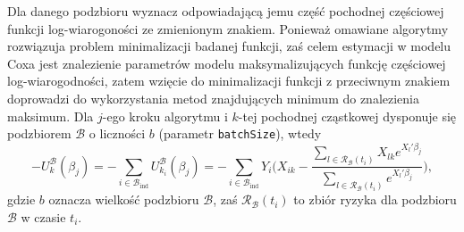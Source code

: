 \begin{Shaded}
\begin{Highlighting}[]
  \StringTok{ }\NormalTok{)\{}
    \StringTok{ }\NormalTok{mf[batchSamplesStarts[i]:(batchSamplesStarts[i]+batchSize}\NormalTok{), ]}
    \StringTok{ }\NormalTok{Y[batchSamplesStarts[i]:(batchSamplesStarts[i]+batchSize}\NormalTok{), ]}
    \StringTok{ }\NormalTok{) \{}
      \StringTok{ }
      \StringTok{ }
      \StringTok{ }
      \StringTok{ }\NormalTok{mf[batchSamplesStarts[i]:(batchSamplesStarts[i]+batchSize}\NormalTok{), ]}
      \StringTok{ }\NormalTok{Y[batchSamplesStarts[i]:(batchSamplesStarts[i]+batchSize}\NormalTok{), ]}
      \StringTok{ }\StringTok{ } 
          \StringTok{ }\NormalTok{(}\NormalTok{:}
          \StringTok{ }
          \StringTok{ }
        \NormalTok{\}}
    \NormalTok{\}}
  \NormalTok{\}}
\end{Highlighting}
\end{Shaded}

Dla danego podzbioru wyznacz odpowiadającą jemu część pochodnej
częściowej funkcji log-wiarogoności ze zmienionym znakiem. Ponieważ
omawiane algorytmy rozwiązuja problem minimalizacji badanej funkcji, zaś
celem estymacji w modelu Coxa jest znalezienie parametrów modelu
maksymalizujących funkcję częściowej log-wiarogodności, zatem wzięcie do
minimalizacji funkcji z przeciwnym znakiem doprowadzi do wykorzystania
metod znajdujących minimum do znalezienia maksimum. Dla \(j\)-ego kroku
algorytmu i \(k\)-tej pochodnej cząstkowej dysponuje się podzbiorem
\(\mathcal{B}\) o liczności \(b\) (parametr \texttt{batchSize}), wtedy
\[-U^\mathcal{B}_k(\beta_j)=-\sum\limits_{i \in \mathcal{B}_\text{ind}}^{}U^\mathcal{B}_{k_{i}}(\beta_j)=-\sum\limits_{i \in \mathcal{B}_\text{ind}}^{}Y_i\Big(X_{ik}-\dfrac{\sum\limits_{l\in \mathscr{R}_\mathcal{B}(t_i)}^{} X_{lk} e^{X_l'\beta_j}}{\sum\limits_{l\in \mathscr{R}_\mathcal{B}(t_i)}^{} e^{X_l'\beta_j}}\Big),\]
gdzie \(b\) oznacza wielkość podzbioru \(\mathcal{B}\), zaś
\(\mathscr{R}_\mathcal{B}(t_i)\) to zbiór ryzyka dla podzbioru
\(\mathcal{B}\) w czasie \(t_i\).

